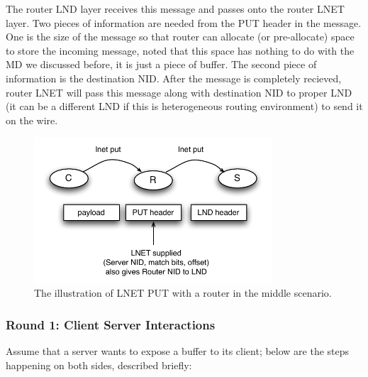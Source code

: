 The router LND layer receives this message and passes onto the router LNET
layer. Two pieces of information are needed from the PUT header in the message.
One is the size of the message so that router can allocate (or pre-allocate)
space to store the incoming message, noted that this space has nothing to do
with the MD we discussed before, it is just a piece of buffer. The second piece
of information is the destination NID. After the message is completely
recieved, router LNET will pass this message along with destination NID to
proper LND (it can be a different LND if this is heterogeneous routing
environment) to send it on the wire.

\begin{figure}[hbt]
\centering
\includegraphics[width=3.5in]{img/lnet_crs}
\caption{The illustration of LNET PUT with a router in the middle scenario.}
\label{fig:crs}
\end{figure}


\subsubsection{Round 1: Client Server Interactions}

Assume that a server wants to expose a buffer to its client; below are the
steps happening on both sides, described briefly:

